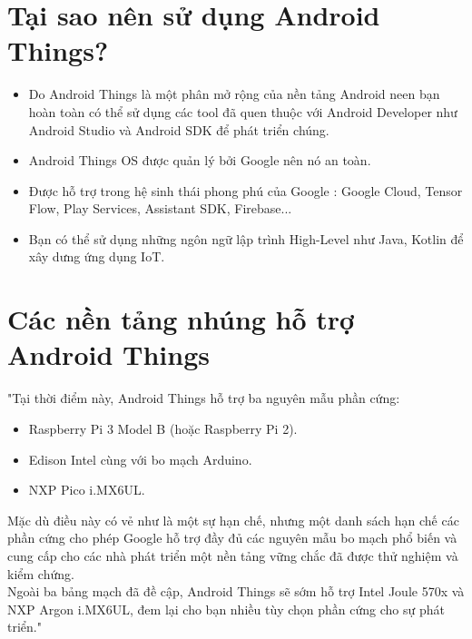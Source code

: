 \section{Tại sao nên sử dụng Android Things?}
\begin{itemize}
\item Do Android Things là một phân mở rộng của nền tảng Android neen bạn hoàn toàn có thể sử dụng các tool đã quen thuộc với Android Developer như Android Studio và Android SDK để phát triển chúng.
\item Android Things OS được quản lý bởi Google nên nó an toàn.
\item Được hỗ trợ trong hệ sinh thái phong phú của Google : Google Cloud, Tensor Flow, Play Services, Assistant SDK, Firebase...
\item Bạn có thể sử dụng những ngôn ngữ lập trình High-Level như Java, Kotlin để xây dưng ứng dụng IoT.\cite{tl6}
\end{itemize}

\section{Các nền tảng nhúng hỗ trợ Android Things}
"Tại thời điểm này, Android Things hỗ trợ ba nguyên mẫu phần cứng: 
\begin{itemize}
\item Raspberry Pi 3 Model B (hoặc Raspberry Pi 2).
\item Edison Intel cùng với bo mạch Arduino.
\item NXP Pico i.MX6UL.
\end{itemize}
Mặc dù điều này có vẻ như là một sự hạn chế, nhưng một danh sách hạn chế các phần cứng cho phép Google hỗ trợ đầy đủ các nguyên mẫu bo mạch phổ biến và cung cấp cho các nhà phát triển một nền tảng vững chắc đã được thử nghiệm và kiểm chứng.\\

Ngoài ba bảng mạch đã đề cập, Android Things sẽ sớm hỗ trợ Intel Joule 570x và NXP Argon i.MX6UL, đem lại cho bạn nhiều tùy chọn phần cứng cho sự phát triển."\cite{tl8}

